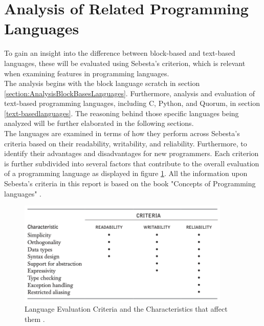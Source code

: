 \section{Analysis of Related Programming Languages} \label{subsection2.3}
To gain an insight into the difference between block-based and text-based languages, these will be evaluated using Sebesta's criterion, which is relevant when examining features in programming languages.\\ 

The analysis begins with the block language scratch in section \ref{section:AnalysisBlockBasesLanguages}. Furthermore, analysis and evaluation of text-based programming languages, including C, Python, and Quorum, in section \ref{text-basedlanguages}. The reasoning behind those specific languages being analyzed will be further elaborated in the following sections. \\

The languages are examined in terms of how they perform across Sebesta's criteria based on their readability, writability, and reliability. Furthermore, to identify their advantages and disadvantages for new programmers. Each criterion is further subdivided into several factors that contribute to the overall evaluation of a programming language as displayed in figure \ref{sebesta_criteria_table}. All the information upon Sebesta's criteria in this report is based on the book "Concepts of Programming languages" \cite{conceptsofproglang}. \\

\begin{figure}[H] 
    \begin{center}
        \includegraphics[width=0.9\textwidth]{Files/Billeder: Analyse/SebestaCriteria.png}
    \end{center}
    \caption{Language Evaluation Criteria and the Characteristics that affect them \cite{conceptsofproglang}.}
    \label{sebesta_criteria_table}
\end{figure}

